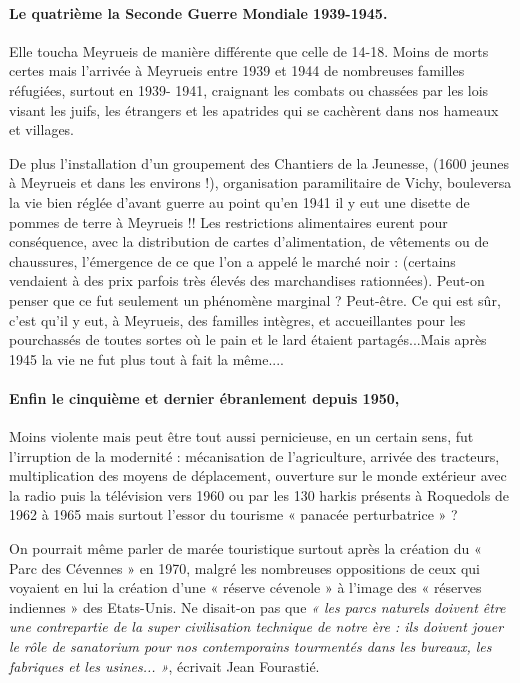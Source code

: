 \paragraph{Le quatrième la Seconde Guerre Mondiale 1939-1945.}

Elle toucha Meyrueis de manière différente que celle de 14-18. Moins de morts certes mais
l’arrivée à Meyrueis entre 1939 et 1944 de nombreuses familles réfugiées, surtout en 1939-
1941, craignant les combats ou chassées par les lois visant les juifs, les étrangers et les
apatrides qui se cachèrent dans nos hameaux et villages.

De plus l’installation d’un groupement des Chantiers de la Jeunesse, (1600 jeunes à Meyrueis
et dans les environs !), organisation paramilitaire de Vichy, bouleversa la vie bien réglée
d’avant guerre au point qu’en 1941 il y eut une disette de pommes de terre à Meyrueis !!
Les restrictions alimentaires eurent pour conséquence, avec la distribution de cartes
d’alimentation, de vêtements ou de chaussures, l’émergence de ce que l’on a appelé le marché
noir : (certains vendaient à des prix parfois très élevés des marchandises rationnées). Peut-on
penser que ce fut seulement un phénomène marginal ? Peut-être. Ce qui est sûr, c’est qu’il y
eut, à Meyrueis, des familles intègres, et accueillantes pour les pourchassés de toutes sortes où
le pain et le lard étaient partagés...Mais après 1945 la vie ne fut plus tout à fait la même....

\paragraph{Enfin le cinquième et dernier ébranlement depuis 1950,}

Moins violente mais peut être tout aussi pernicieuse, en un certain sens, fut l’irruption de la
modernité : mécanisation de l’agriculture, arrivée des tracteurs, multiplication des moyens de
déplacement, ouverture sur le monde extérieur avec la radio puis la télévision vers 1960 ou
par les 130 harkis présents à Roquedols de 1962 à 1965 mais surtout l’essor du
tourisme « panacée perturbatrice » ?

On pourrait même parler de marée touristique surtout après la création du « Parc des
Cévennes » en 1970, malgré les nombreuses oppositions de ceux qui voyaient en lui la
création d’une « réserve cévenole » à l’image des « réserves indiennes » des Etats-Unis. Ne
disait-on pas que \emph{« les parcs naturels doivent être une contrepartie de la super civilisation technique de notre
ère : ils doivent jouer le rôle de sanatorium pour nos contemporains tourmentés dans les bureaux, les fabriques
et les usines... »}, écrivait Jean Fourastié.

